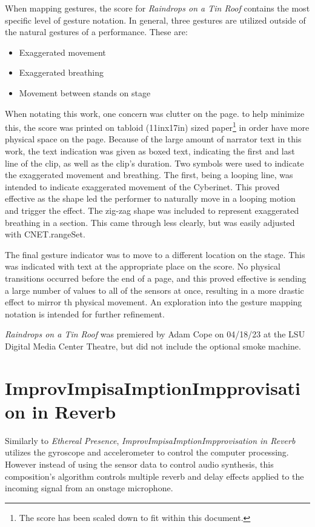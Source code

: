 When mapping gestures, the score for \textit{Raindrops on a Tin Roof} contains the most specific level of gesture notation. In general, three gestures are utilized outside of the natural gestures of a performance. These are: 

\begin{itemize}
    \item Exaggerated movement
    \item Exaggerated breathing
    \item Movement between stands on stage
\end{itemize}

When notating this work, one concern was clutter on the page. to help minimize this, the score was printed on tabloid (11inx17in) sized paper\footnote{The score has been scaled down to fit within this document.} in order have more physical space on the page. Because of the large amount of narrator text in this work, the text indication was given as boxed text, indicating the first and last line of the clip, as well as the clip's duration. Two symbols were used to indicate the exaggerated movement and breathing. The first, being a looping line, was intended to indicate exaggerated movement of the Cyberinet. This proved effective as the shape led the performer to naturally move in a looping motion and trigger the effect. The zig-zag shape was included to represent exaggerated breathing in a section. This came through less clearly, but was easily adjusted with CNET.rangeSet.

The final gesture indicator was to move to a different location on the stage. This was indicated with text at the appropriate place on the score. No physical transitions occurred before the end of a page, and this proved effective is sending a large number of values to all of the sensors at once, resulting in a more drastic effect to mirror th physical movement. An exploration into the gesture mapping notation is intended for further refinement.

\textit{Raindrops on a Tin Roof} was premiered by Adam Cope on 04/18/23 at the LSU Digital Media Center Theatre, but did not include the optional smoke machine.

\section{ImprovImpisaImptionImpprovisation in Reverb}
Similarly to \textit{Ethereal Presence}, \textit{ImprovImpisaImptionImpprovisation in Reverb} utilizes the gyroscope and accelerometer to control the computer processing. However instead of using the sensor data to control audio synthesis, this composition's algorithm controls multiple reverb and delay effects applied to the incoming signal from an onstage microphone.

